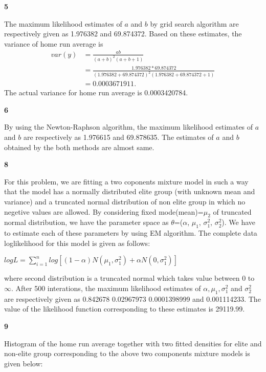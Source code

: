 \documentclass[10pt]{article}
\begin{document}
\begin{newpage}
\begin{newpage}
\begin{center}
\textbf{5}
\end{center}
The maximum likelihood estimates of $a$ and $b$ by grid search algorithm are respectively given as 1.976382 and 69.874372. Based on these estimates, the variance of home run average is
\begin{equation*}
\begin{split}
var(y)&=\frac{ab}{(a+b)^2(a+b+1)}\\
&=\frac{1.976382*69.874372}{(1.976382+69.874372)^2(1.976382+69.874372+1)}\\
&= 0.0003671911. 
\end{split}
\end{equation*}
The actual variance for home run average is 0.0003420784.
\begin{center}
\textbf{6}
\end{center}
By using the Newton-Raphson algorithm, the maximum likelihood estimates of $a$ and $b$ are respectively as 1.976615 and 69.878635. The estimates of $a$ and $b$ obtained by the both methods are almost same.
\begin{center}
\textbf{8}
\end{center}
For this problem, we are fitting a two coponents mixture model in such a way that the model has a normally distributed elite group (with unknown mean and variance) and a truncated normal distribution of non elite group in which no negetive values are allowed. By considering fixed mode(mean)=$\mu_{2}$ of truncated normal distribution, we have the parameter space as $\theta$=($\alpha$, $\mu_{1}$, $\sigma_{1}^{2}$, $\sigma_{2}^{2}$). We have to estimate each of these parameters by using EM algorithm. The complete data loglikelihood for this model is given as follows:
\begin{center}
$logL=\sum_{i=1}^{n}log[(1-\alpha)N(\mu_{1},\sigma_{1}^2)+\alpha N(0,\sigma_{1}^{2})]$
\end{center}
where second distribution is a truncated normal which takes value between 0 to $\infty$. After 500 interations, the maximum likelihood estimates of $\alpha,\mu_{1},\sigma_{1}^{2}$ and $\sigma_{2}^{2}$ are respectively given as  0.842678 0.02967973 0.0001398999 and 0.001114233. The value of the likelihood function corresponding to these estimates is 29119.99.
\begin{center}
\textbf{9}
\end{center}
Histogram of the home run average together with two fitted densities for elite and non-elite group corresponding to the above two components mixture models is given below: 

\end{newpage}
\end{newpage}
\end{document}
